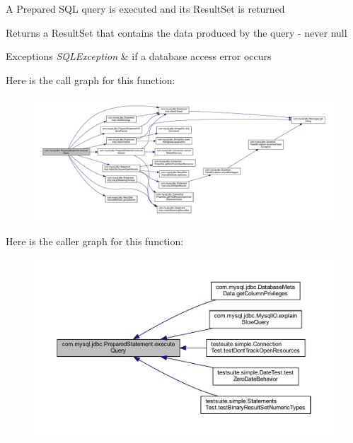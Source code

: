 A Prepared S\+QL query is executed and its Result\+Set is returned

\begin{DoxyReturn}{Returns}
a Result\+Set that contains the data produced by the query -\/ never null
\end{DoxyReturn}

\begin{DoxyExceptions}{Exceptions}
{\em S\+Q\+L\+Exception} & if a database access error occurs \\
\hline
\end{DoxyExceptions}
Here is the call graph for this function\+:
\nopagebreak
\begin{figure}[H]
\begin{center}
\leavevmode
\includegraphics[width=350pt]{classcom_1_1mysql_1_1jdbc_1_1_prepared_statement_a4a9164e855e1f7848142de8973a6dab6_cgraph}
\end{center}
\end{figure}
Here is the caller graph for this function\+:
\nopagebreak
\begin{figure}[H]
\begin{center}
\leavevmode
\includegraphics[width=350pt]{classcom_1_1mysql_1_1jdbc_1_1_prepared_statement_a4a9164e855e1f7848142de8973a6dab6_icgraph}
\end{center}
\end{figure}
\mbox{\label{classcom_1_1mysql_1_1jdbc_1_1_prepared_statement_a356cdeaae7b10fb79da4806e829a2190}} 
